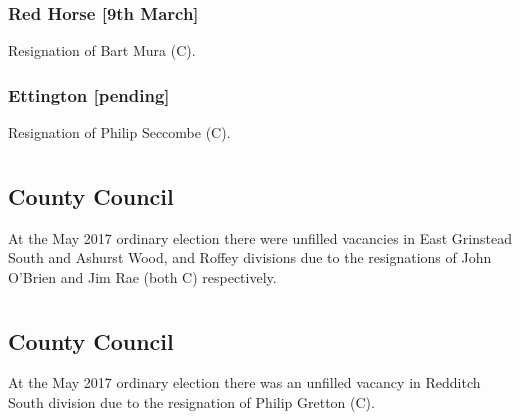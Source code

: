 \documentclass[a4paper,openany]{book}
\begin{document}
\begin{resultsiii}
\subsubsection*{Red Horse \hspace*{\fill}\nolinebreak[1]%
\enspace\hspace*{\fill}
[9th March]}


Resignation of Bart Mura (C).

\subsubsection*{Ettington \hspace*{\fill}\nolinebreak[1]%
\enspace\hspace*{\fill}
[pending]}


Resignation of Philip Seccombe (C).

\section[West Sussex]{}

\subsection*{County Council}

At the May 2017 ordinary election there were unfilled vacancies in East Grinstead South and Ashurst Wood, and Roffey divisions due to the resignations of John O'Brien and Jim Rae (both C) respectively.

\section[Worcestershire]{}

\subsection*{County Council}

At the May 2017 ordinary election there was an unfilled vacancy in Redditch South division due to the resignation of Philip Gretton (C).


\end{resultsiii}
\end{document}
